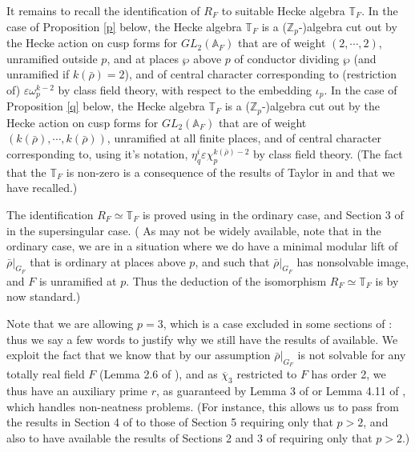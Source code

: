 \documentclass[12pt]{amsart}
\newcommand{\T}{\mathbb{T}}
\newcommand{\A}{\mathbb{A}}
\newcommand{\Z}{\mathbb{Z}}
\newcommand{\rhobar}{\overline{\rho}}
\def\rhobar{ {\bar {\rho} } }
\newcommand{\vep}{{\varepsilon}}
\begin{document}
It remains to recall the identification of $R_F$ to suitable Hecke algebra $\T_F$.
In the  case of Proposition \ref{p} below, the Hecke algebra $\T_F$ is a ($\Z_p$-)algebra cut out by the 
Hecke action on cusp forms for $GL_2(\A_F)$ that are of weight $(2,\cdots,2)$, 
unramified outside $p$, and at places $\wp$ above $p$ of conductor dividing $\wp$ (and unramified if $k(\rhobar)=2$), and
of central character corresponding to (restriction of) $\vep \omega_p^{k-2}$ by class field theory, with respect to the embedding $\iota_p$.
In the case of Proposition \ref{q} below, the Hecke algebra $\T_F$ is a ($\Z_p$-)algebra 
cut out by the 
Hecke action on cusp forms for $GL_2(\A_F)$ that are of weight $(k(\rhobar),
\cdots,k(\rhobar))$, unramified at all finite places, and of central character 
corresponding to, using it's notation, $\eta_q^i \vep \chi_p^{k(\rhobar)-2}$ by class field theory. 
(The fact that the $\T_F$ is non-zero is a consequence of the results of 
Taylor in \cite{Tay1} and \cite{Tay2} that we have recalled.) 

The identification $R_F\simeq \T_F$
is proved using \cite{Fujiwara} in the ordinary case, and  
Section 3 of \cite{Tay2} in the supersingular case. ({\small 
As \cite{Fujiwara} may not be widely available, note that in the ordinary case,
we are in a situation where we do have a minimal modular lift of $\rhobar|_{G_F}$ that is ordinary at places above $p$, and such that $\rhobar|_{G_F}$ has nonsolvable image, and $F$ is unramified at $p$. Thus the deduction of the isomorphism 
$R_F \simeq \T_F$ is by now standard.})

Note that we are allowing $p=3$, which is a case excluded in
some sections of \cite{Tay2}: thus we say a few words to justify why we still have the results of \cite{Tay2} available. We exploit the fact that we know 
that by our assumption 
$\rhobar|_{G_F}$ is not solvable for any totally real field $F$ (Lemma 2.6 of \cite{KW}), and as
$\overline \chi_3$ restricted to $F$ has order 2, 
 we thus have an auxiliary prime $r$, as guaranteed
by Lemma 3  of \cite{DT} or Lemma 4.11 of \cite{[DDT]}, which handles non-neatness problems. (For instance, this allows us to pass from the results in Section 4 of \cite{Tay2}
to those of Section 5 requiring only that $p>2$, and also to have available the results of Sections 2 and 3 of \cite{Tay2} requiring only that $p>2$.)
\end{document}

